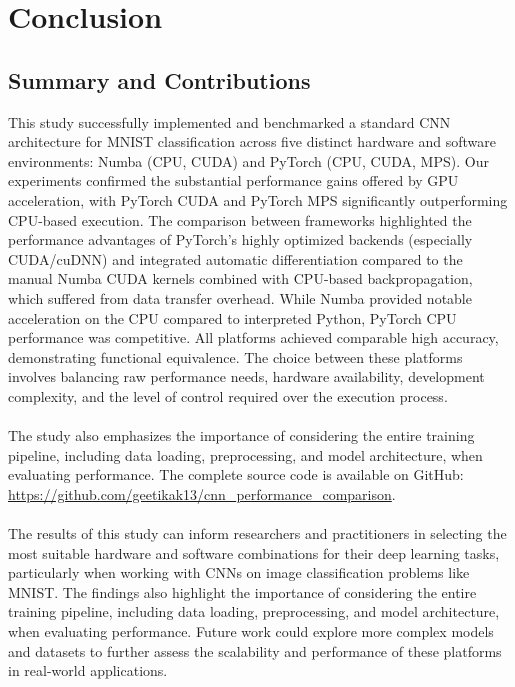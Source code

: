 \documentclass[conference]{IEEEtran} %
\begin{document}
\section{Conclusion}
\subsection{Summary and Contributions}
\label{sec:summary}
This study successfully implemented and benchmarked a standard CNN architecture for MNIST classification across five distinct hardware and software environments: Numba (CPU, CUDA) and PyTorch (CPU, CUDA, MPS). Our experiments confirmed the substantial performance gains offered by GPU acceleration, with PyTorch CUDA and PyTorch MPS significantly outperforming CPU-based execution. The comparison between frameworks highlighted the performance advantages of PyTorch's highly optimized backends (especially CUDA/cuDNN) and integrated automatic differentiation compared to the manual Numba CUDA kernels combined with CPU-based backpropagation, which suffered from data transfer overhead. While Numba provided notable acceleration on the CPU compared to interpreted Python, PyTorch CPU performance was competitive. All platforms achieved comparable high accuracy, demonstrating functional equivalence. The choice between these platforms involves balancing raw performance needs, hardware availability, development complexity, and the level of control required over the execution process.
\\
\\
The study also emphasizes the importance of considering the entire training pipeline, including data loading, preprocessing, and model architecture, when evaluating performance. The complete source code is available on GitHub: \url{https://github.com/geetikak13/cnn_performance_comparison}.
\\
\\
The results of this study can inform researchers and practitioners in selecting the most suitable hardware and software combinations for their deep learning tasks, particularly when working with CNNs on image classification problems like MNIST. The findings also highlight the importance of considering the entire training pipeline, including data loading, preprocessing, and model architecture, when evaluating performance. Future work could explore more complex models and datasets to further assess the scalability and performance of these platforms in real-world applications.
\end{document}
